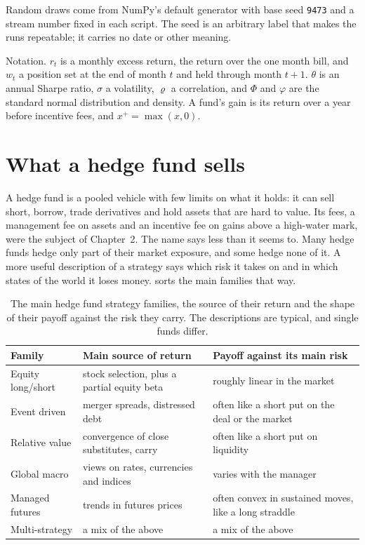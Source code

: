 \begin{chapterrefs}
\begin{keybox}
Random draws come from NumPy's default generator with base seed \texttt{9473} and a stream number
fixed in each script. The seed is an arbitrary label that makes the runs repeatable; it carries no
date or other meaning.

Notation. $r_t$ is a monthly excess return, the return over the one month bill, and $w_t$ a position
set at the end of month $t$ and held through month $t+1$. $\theta$ is an annual Sharpe ratio, $\sigma$
a volatility, $\varrho$ a correlation, and $\Phi$ and $\varphi$ are the standard normal distribution and
density. A fund's gain is its return over a year before incentive fees, and $x^+=\max(x,0)$.
\end{keybox}

\FloatBarrier
\section{What a hedge fund sells}
\label{sec9:families}

A hedge fund is a pooled vehicle with few limits on what it holds: it can sell short, borrow, trade
derivatives and hold assets that are hard to value. Its fees, a management fee on assets and an
incentive fee on gains above a high-water mark, were the subject of Chapter~2. The name says less
than it seems to. Many hedge funds hedge only part of their market exposure, and some hedge none of
it. A more useful description of a strategy says which risk it takes on and in which states of the
world it loses money.  sorts the main families that way.

\begin{table}[t]
  \centering
  \small
  \caption{The main hedge fund strategy families, the source of their return and the shape of
  their payoff against the risk they carry. The descriptions are typical, and single funds differ.}
  \label{tab9:families}
  \setlength{\tabcolsep}{4pt}
  \begin{tabular}{@{}p{}p{}p{}@{}}
    \toprule
    Family & Main source of return & Payoff against its main risk\\
    \midrule
    Equity long/short & stock selection, plus a partial equity beta & roughly linear in the market\\
    Event driven & merger spreads, distressed debt & often like a short put on the deal or the market\\
    Relative value & convergence of close substitutes, carry & often like a short put on liquidity\\
    Global macro & views on rates, currencies and indices & varies with the manager\\
    Managed futures & trends in futures prices & often convex in sustained moves, like a long straddle\index{Straddle}\\
    Multi-strategy & a mix of the above & a mix of the above\\
    \bottomrule
  \end{tabular}
\end{table}


\end{chapterrefs}
